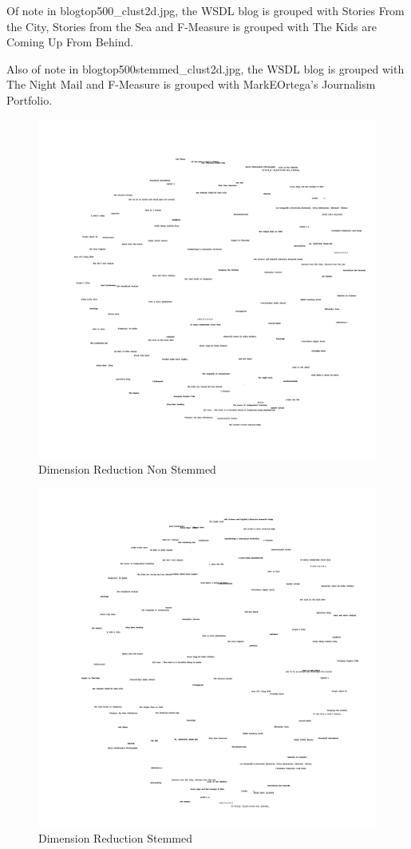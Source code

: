 \documentclass[letterpaper,10pt]{article}
\begin{document}
Of note in blogtop500\_clust2d.jpg, the WSDL blog is grouped with Stories From the City, Stories from the Sea and F-Measure is grouped with The Kids are Coming Up From Behind.

Also of note in blogtop500stemmed\_clust2d.jpg, the WSDL blog is grouped with The Night Mail and F-Measure is grouped with MarkEOrtega's Journalism Portfolio.

\newpage
\begin{figure}[htbp]
\includegraphics[scale=0.20]{datafiles/blogtop500_clust2d.jpg}
\caption{Dimension Reduction Non Stemmed}
\label{fig:dim}
\end{figure}
\newpage
\begin{figure}[htbp]
\includegraphics[scale=0.20]{datafiles/blogtop500stemmed_clust2d.jpg}
\caption{Dimension Reduction Stemmed}
\label{fig:dimstem}
\end{figure}
\newpage
\end{document}
